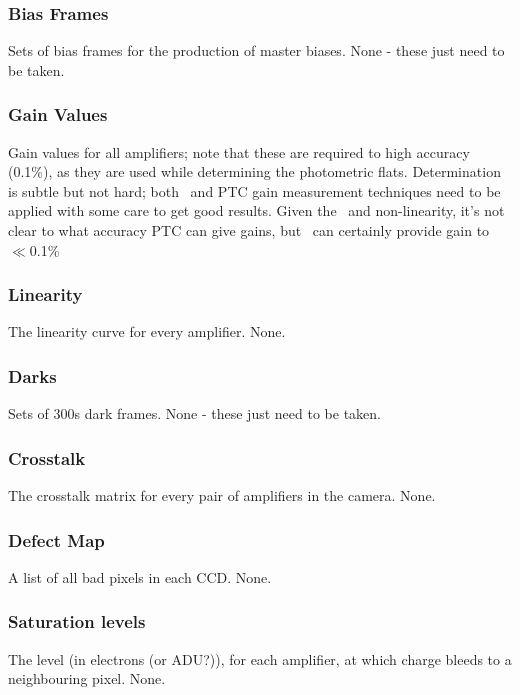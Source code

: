 \subsubsection{Bias Frames}\label{inputs:biases} 
Sets of bias frames for the production of master biases.
\alg None - these just need to be taken.


\subsubsection{Gain Values}\label{inputs:gain} 
\cameraTeam
Gain values for all amplifiers;  note that these are required to high accuracy (0.1\%), as they are used while determining the photometric flats.
\alg Determination is subtle but not hard; both \fefiftyfive\ and PTC gain measurement techniques need to be applied with some care to get good results. Given the \bfeffect\ and non-linearity, it's not clear to what accuracy PTC can give gains, but \fefiftyfive\ can certainly provide gain to $\ll$0.1\% 


\subsubsection{Linearity}\label{inputs:linearityCurve} 
\cameraTeam
The linearity curve for every amplifier.
\alg None.


\subsubsection{Darks}\label{inputs:dark}
Sets of 300s dark frames.
\alg None - these just need to be taken.


\subsubsection{Crosstalk}\label{inputs:crosstalk}
\cameraTeam
The crosstalk matrix for every pair of amplifiers in the camera.
\alg None.


\subsubsection{Defect Map}\label{inputs:defectList} 
\cameraTeam
A list of all bad pixels in each CCD.
\alg None.


\subsubsection{Saturation levels}\label{inputs:saturationLevel}
\cameraTeam
The level (in electrons (or ADU?)), for each amplifier, at which charge bleeds to a neighbouring pixel. 
\alg None.



